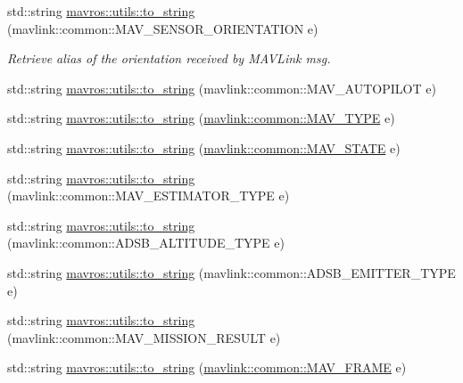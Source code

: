 \begin{DoxyCompactItemize}
\item 
std\+::string \mbox{\hyperlink{group__mavutils_ga014455201c2903b835912e056c64d02f}{mavros\+::utils\+::to\+\_\+string}} (mavlink\+::common\+::\+M\+A\+V\+\_\+\+S\+E\+N\+S\+O\+R\+\_\+\+O\+R\+I\+E\+N\+T\+A\+T\+I\+ON e)
\begin{DoxyCompactList}\small\item\em Retrieve alias of the orientation received by M\+A\+V\+Link msg. \end{DoxyCompactList}\item 
std\+::string \mbox{\hyperlink{group__mavutils_gaf790b7f7da119e86e0875c9def1f45aa}{mavros\+::utils\+::to\+\_\+string}} (mavlink\+::common\+::\+M\+A\+V\+\_\+\+A\+U\+T\+O\+P\+I\+L\+OT e)
\item 
std\+::string \mbox{\hyperlink{group__mavutils_gac2fb656a52c699748f929392f47523bf}{mavros\+::utils\+::to\+\_\+string}} (\mbox{\hyperlink{include__v0_89_2mavlink__types_8h_aaf404a9fdbd4c9a05d6cab18790dbb28}{mavlink\+::common\+::\+M\+A\+V\+\_\+\+T\+Y\+PE}} e)
\item 
std\+::string \mbox{\hyperlink{group__mavutils_gaafc0054ec09db1d1fd1560da7be6d265}{mavros\+::utils\+::to\+\_\+string}} (\mbox{\hyperlink{include__v0_89_2mavlink__types_8h_a3ca5e79cdc1f95d953a6d1d7ab1e90bb}{mavlink\+::common\+::\+M\+A\+V\+\_\+\+S\+T\+A\+TE}} e)
\item 
std\+::string \mbox{\hyperlink{group__mavutils_ga3e1f543b99b1e237a90ccdad25bd3bdb}{mavros\+::utils\+::to\+\_\+string}} (mavlink\+::common\+::\+M\+A\+V\+\_\+\+E\+S\+T\+I\+M\+A\+T\+O\+R\+\_\+\+T\+Y\+PE e)
\item 
std\+::string \mbox{\hyperlink{group__mavutils_ga8e40158252eb7c24a59036afd35bf12b}{mavros\+::utils\+::to\+\_\+string}} (mavlink\+::common\+::\+A\+D\+S\+B\+\_\+\+A\+L\+T\+I\+T\+U\+D\+E\+\_\+\+T\+Y\+PE e)
\item 
std\+::string \mbox{\hyperlink{group__mavutils_gab8a1c172a6993c1b668f923e58da594f}{mavros\+::utils\+::to\+\_\+string}} (mavlink\+::common\+::\+A\+D\+S\+B\+\_\+\+E\+M\+I\+T\+T\+E\+R\+\_\+\+T\+Y\+PE e)
\item 
std\+::string \mbox{\hyperlink{group__mavutils_gaa3707eb566a03171dd282eeb7d3ca512}{mavros\+::utils\+::to\+\_\+string}} (mavlink\+::common\+::\+M\+A\+V\+\_\+\+M\+I\+S\+S\+I\+O\+N\+\_\+\+R\+E\+S\+U\+LT e)
\item 
std\+::string \mbox{\hyperlink{group__mavutils_gaa89b7f807c7cf4be1a8d04377d8ad3bc}{mavros\+::utils\+::to\+\_\+string}} (\mbox{\hyperlink{include__v0_89_2mavlink__types_8h_aae9266d97d838a375605b69000c60617}{mavlink\+::common\+::\+M\+A\+V\+\_\+\+F\+R\+A\+ME}} e)

\end{DoxyCompactItemize}

